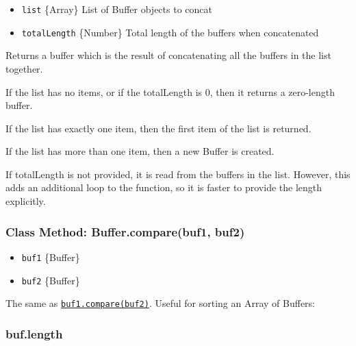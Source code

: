 \begin{itemize}
\itemsep1pt\parskip0pt
\item
  \texttt{list} \{Array\} List of Buffer objects to concat
\item
  \texttt{totalLength} \{Number\} Total length of the buffers when
  concatenated
\end{itemize}

Returns a buffer which is the result of concatenating all the buffers in
the list together.

If the list has no items, or if the totalLength is 0, then it returns a
zero-length buffer.

If the list has exactly one item, then the first item of the list is
returned.

If the list has more than one item, then a new Buffer is created.

If totalLength is not provided, it is read from the buffers in the list.
However, this adds an additional loop to the function, so it is faster
to provide the length explicitly.

\subsubsection{Class Method: Buffer.compare(buf1,
buf2)}\label{class-method-buffer.comparebuf1-buf2}

\begin{itemize}
\itemsep1pt\parskip0pt
\item
  \texttt{buf1} \{Buffer\}
\item
  \texttt{buf2} \{Buffer\}
\end{itemize}

The same as
\hyperref[bufferux5fbufux5fcompareux5fotherbuffer]{\texttt{buf1.compare(buf2)}}.
Useful for sorting an Array of Buffers:

\begin{Shaded}
\begin{Highlighting}[]
 \NormalTok{arr = [}\NormalTok{(}\NormalTok{), }\NormalTok{(}\NormalTok{)];}
\NormalTok{(}\NormalTok{);}
\end{Highlighting}
\end{Shaded}

\subsubsection{buf.length}\label{buf.length}

